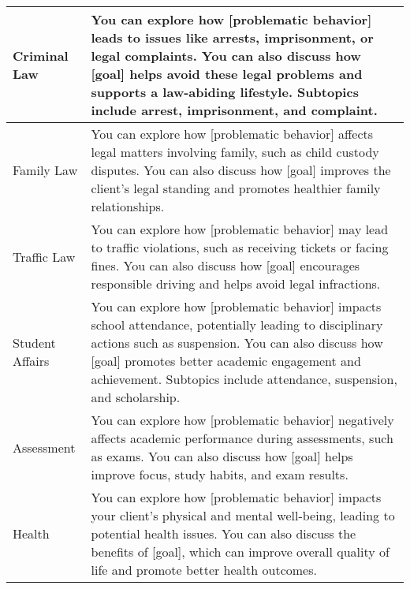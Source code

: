 \begin{table*}[tb]
\begin{tabularx}{\textwidth}{lX}
Criminal Law                & You can explore how [problematic behavior] leads to issues like arrests, imprisonment, or legal complaints. You can also discuss how [goal] helps avoid these legal problems and supports a law-abiding lifestyle. Subtopics include arrest, imprisonment, and complaint.                                                                                                                                                          \\ \hline
Family Law                  & You can explore how [problematic behavior] affects legal matters involving family, such as child custody disputes. You can also discuss how [goal] improves the client’s legal standing and promotes healthier family relationships.                                                                                                                                                                                               \\ \hline
Traffic Law                 & You can explore how [problematic behavior] may lead to traffic violations, such as receiving tickets or facing fines. You can also discuss how [goal] encourages responsible driving and helps avoid legal infractions.                                                                                                                                                                                                            \\ \hline
Student Affairs             & You can explore how [problematic behavior] impacts school attendance, potentially leading to disciplinary actions such as suspension. You can also discuss how [goal] promotes better academic engagement and achievement. Subtopics include attendance, suspension, and scholarship.                                                                                                                                              \\ \hline
Assessment                  & You can explore how [problematic behavior] negatively affects academic performance during assessments, such as exams. You can also discuss how [goal] helps improve focus, study habits, and exam results.                                                                                                                                                                                                                         \\ \hline
Health                      & You can explore how [problematic behavior] impacts your client's physical and mental well-being, leading to potential health issues. You can also discuss the benefits of [goal], which can improve overall quality of life and promote better health outcomes.                                                                                                                                                                    \\ \hline

\end{tabularx}
\end{table*}
